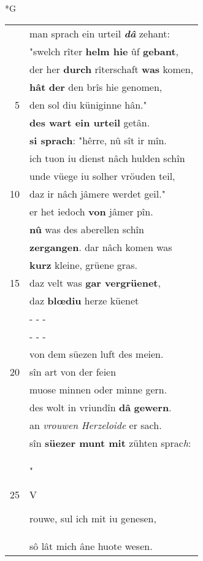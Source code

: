 \documentclass[8pt,a4paper,notitlepage]{article}
\begin{document}
\begin{table}[ht]
\begin{minipage}[t]{0.5\linewidth}
\small
\begin{center}*G
\end{center}
\begin{tabular}{rl}
 & man sprach ein urteil \textit{\textbf{dâ}} zehant:\\ 
 & "swelch rîter \textbf{helm hie} ûf \textbf{gebant},\\ 
 & der her \textbf{durch} rîterschaft \textbf{was} komen,\\ 
 & \textbf{hât} \textbf{der} den brîs hie genomen,\\ 
5 & den sol diu küniginne hân."\\ 
 & \textbf{des wart ein urteil} getân.\\ 
 & \textbf{si sprach}: "hêrre, nû sît ir mîn.\\ 
 & ich tuon iu dienst nâch hulden schîn\\ 
 & unde vüege iu solher vröuden teil,\\ 
10 & daz ir nâch jâmere werdet geil."\\ 
 & er het iedoch \textbf{von} jâmer pîn.\\ 
 & \textbf{nû} was des aberellen schîn\\ 
 & \textbf{zergangen}. dar nâch komen was\\ 
 & \textbf{kurz} kleine, grüene gras.\\ 
15 & daz velt was \textbf{gar vergrüenet},\\ 
 & daz \textbf{blœdiu} herze küenet\\ 
 & \multicolumn{1}{l}{ - - - }\\ 
 & \multicolumn{1}{l}{ - - - }\\ 
 & von dem süezen luft des meien.\\ 
20 & sîn art von der feien\\ 
 & muose minnen oder minne gern.\\ 
 & des wolt in vriundîn \textbf{dâ} \textbf{gewern}.\\ 
 & an \textit{vrouwen} \textit{Herzeloide} er sach.\\ 
 & sîn \textbf{süezer munt mit} zühten sprac\textit{h}:\\ 
25 & "\begin{large}V\end{large}rouwe, sul ich mit iu genesen,\\ 
 & sô lât mich âne huote wesen.\\ 

\end{tabular}
\end{minipage}
\end{table}
\end{document}
